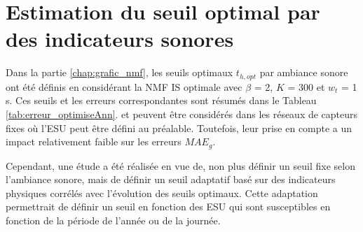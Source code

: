 \chapter{Estimation du seuil optimal par des indicateurs sonores}\label{annexe:optThreshold}

Dans la partie \ref{chap:grafic_nmf}, les seuils optimaux $t_{h,opt}$ par ambiance sonore ont été définis en considérant la NMF IS optimale avec $\beta$ = 2, $K$ = 300 et $w_t$ = 1 s. Ces seuils et les erreurs correspondantes  sont résumés dans le Tableau \ref{tab:erreur_optimiseAnn}.
et peuvent être considérés dans les réseaux de capteurs fixes où l'ESU peut être défini au préalable. Toutefois, leur prise en compte a un impact relativement faible sur les erreurs $MAE_g$. 

Cependant, une étude a été réalisée en vue de, non plus définir un seuil fixe selon l'ambiance sonore, mais de définir un seuil adaptatif basé sur des indicateurs physiques corrélés avec l'évolution des seuils optimaux. Cette adaptation permettrait de définir un seuil en fonction des ESU qui sont susceptibles en fonction de la période de l'année ou de la journée.

\begin{table}[h]
\centering
\caption{Erreurs $MAE_{60}$ minimales selon le seuil optimal $t_{h,opt}$ par ambiance sonore.}
\label{tab:erreur_optimiseAnn}
\end{table}


